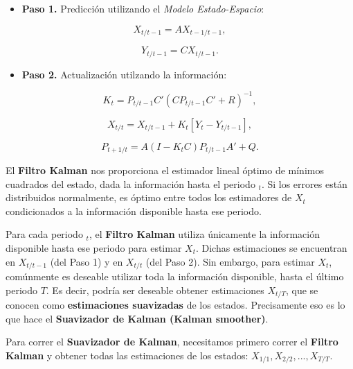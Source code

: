 \documentclass[
]{book}
\providecommand{\tightlist}{%
  \setlength{\itemsep}{0pt}\setlength{\parskip}{0pt}}
\begin{document}
\begin{itemize}
\tightlist
\item
  \textbf{Paso 1.} Predicción utilizando el \emph{Modelo Estado-Espacio}:
\end{itemize}

\begin{equation}
X_{t/t-1} = A X_{t-1/t-1},
\label{eq:P1}
\end{equation}

\begin{equation}
Y_{t/t-1} = C X_{t/t-1}.
\label{eq:P2}
\end{equation}

\begin{itemize}
\tightlist
\item
  \textbf{Paso 2.} Actualización utilzando la información:
\end{itemize}

\begin{equation}
K_t = P_{t/t-1} C' (C P_{t/t-1} C' + R)^{-1},
\label{eq:A1}
\end{equation}

\begin{equation}
X_{t/t} = X_{t/t-1} + K_t [Y_t - Y_{t/t-1}],
\label{eq:A2}
\end{equation}

\begin{equation}
P_{t+1/t} = A (I - K_t C) P_{t/t-1} A' + Q.
\label{eq:A3}
\end{equation}

El \textbf{Filtro Kalman} nos proporciona el estimador lineal óptimo de mínimos cuadrados del estado, dada la información hasta el periodo \(_t\). Si los errores están distribuidos normalmente, es óptimo entre todos los estimadores de \(X_t\) condicionados a la información disponible hasta ese periodo.

Para cada periodo \(_t\), el \textbf{Filtro Kalman} utiliza únicamente la información disponible hasta ese periodo para estimar \(X_t\). Dichas estimaciones se encuentran en \(X_{t/t-1}\) (del Paso 1) y en \(X_{t/t}\) (del Paso 2). Sin embargo, para estimar \(X_t\), comúnmente es deseable utilizar toda la información disponible, hasta el último periodo \(T\). Es decir, podría ser deseable obtener estimaciones \(X_{t/T}\), que se conocen como \textbf{estimaciones suavizadas} de los estados. Precisamente eso es lo que hace el \textbf{Suavizador de Kalman (Kalman smoother)}.

Para correr el \textbf{Suavizador de Kalman}, necesitamos primero correr el \textbf{Filtro Kalman} y obtener todas las estimaciones de los estados: \(X_{1/1}, X_{2/2},...,X_{T/T}\).
\end{document}
